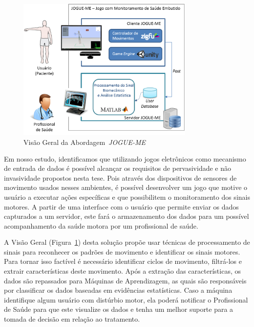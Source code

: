 \begin{figure}[!h]
     \centering
     \includegraphics[width=0.78\textwidth]{./img/visaosistema.png}
     \caption{Visão Geral da Abordagem~\textit{JOGUE-ME}}
     \label{img:visaogeral}
\end{figure}

Em nosso estudo, identificamos que utilizando jogos eletrônicos como mecanismo de entrada de dados é possível alcançar os requisitos de pervasividade e não invasividade propostos nesta tese. Pois através dos dispositivos de sensores de movimento usados nesses ambientes, é possível desenvolver um jogo que motive o usuário a executar ações específicas e que possibilitem o monitoramento dos sinais motores. A partir de uma interface com o usuário que permite enviar os dados capturados a um servidor, este fará o armazenamento dos dados para um possível acompanhamento da saúde motora por um profissional de saúde.

A Visão Geral (Figura~\ref{img:visaogeral}) desta solução propõe usar técnicas de processamento de sinais para reconhecer os padrões de movimento e identificar os sinais motores. Para tornar isso factível é necessário identificar ciclos de movimento, filtrá-los e extrair características deste movimento. Após a extração das características, os dados são repassados para Máquinas de Aprendizagem, as quais são responsáveis por classificar os dados baseadas em evidências estatísticas. Caso a máquina identifique algum usuário com distúrbio motor, ela poderá notificar o Profissional de Saúde para que este visualize os dados e tenha um melhor suporte para a tomada de decisão em relação ao tratamento.


